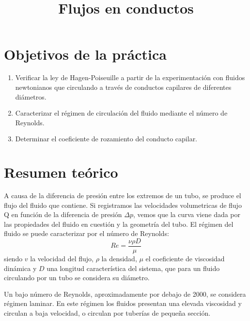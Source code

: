 \documentclass[a4paper,12pt,spanish]{article}
\begin{document}
	
	
	\title{ Flujos en conductos}
	
	\date{}
	
	\maketitle
	
	
	\section{Objetivos de la práctica}
	
	\begin{enumerate}
		\item Verificar la ley de Hagen-Poiseuille a partir de la experimentación con fluidos newtonianos que circulando a través de conductos capilares de diferentes diámetros.
		\item Caracterizar el régimen de circulación del fluido mediante el número de Reynolds.
		\item Determinar el coeficiente de rozamiento del conducto capilar.
	\end{enumerate}
	
	
	
	\section{Resumen teórico}
	
	A causa de la diferencia de presión entre los extremos de un tubo, se produce el flujo del fluido que contiene. Si registramos las velocidades volumetricas de flujo Q en función de la diferencia de presión $\mathit{\Delta }p$, vemos que la curva viene dada por las propiedades del fluido en cuestión y la geometría del tubo. El régimen del fluido se puede caracterizar por el número de Reynolds:
	\[ Re = \frac{\nu\rho D}{\mu}
	\]
	siendo $v$ la velocidad del flujo, $\rho$ la densidad, $\mu $ el coeficiente de viscosidad dinámica y $D$ una longitud característica del sistema, que para un fluido circulando por un tubo se considera su diámetro. 
	
	Un bajo número de Reynolds, aproximadamente por debajo de 2000, se considera régimen laminar. En este régimen los fluidos presentan una elevada viscosidad y circulan a baja velocidad, o circulan por tuberías de pequeña sección. 
	
\end{document}
